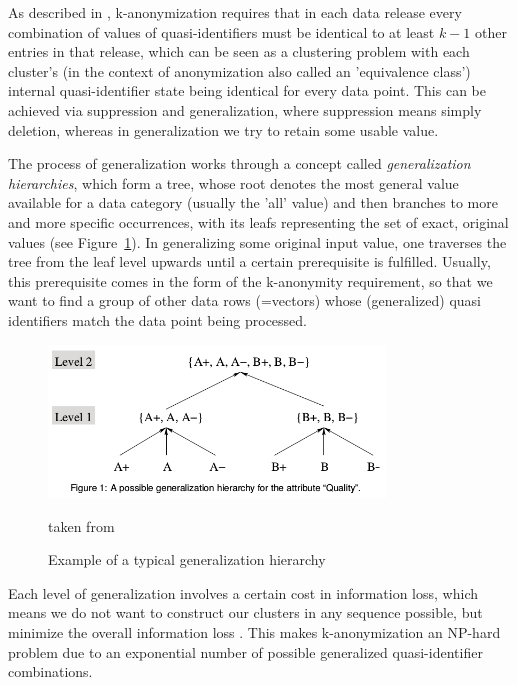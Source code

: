 \documentclass{llncs}
\begin{document}
As described in \cite{ciriani2007kappa}, k-anonymization requires that in each data release every combination of values of quasi-identifiers must be identical to at least $k-1$ other entries in that release, which can be seen as a clustering problem with each cluster's (in the context of anonymization also called an 'equivalence class') internal quasi-identifier state being identical for every data point. This can be achieved via suppression and generalization, where suppression means simply deletion, whereas in generalization we try to retain some usable value.

The process of generalization works through a concept called \textit{generalization hierarchies}, which form a tree, whose root denotes the most general value available for a data category (usually the 'all' value) and then branches to more and more specific occurrences, with its leafs representing the set of exact, original values (see Figure~\ref{fig:gen_hierarchy}). In generalizing some original input value, one traverses the tree from the leaf level upwards until a certain prerequisite is fulfilled. Usually, this prerequisite comes in the form of the k-anonymity requirement, so that we want to find a group of other data rows (=vectors) whose (generalized) quasi identifiers match the data point being processed.

\begin{figure}[!t]
	\begin{center}
		\includegraphics[width=0.8\textwidth]{figures/anonym/gen_hierarchy}
		\caption{Example of a typical generalization hierarchy}
		\label{fig:gen_hierarchy}
		\small
		taken from \cite{aggarwal2005approximation}
	\end{center}
\end{figure}


Each level of generalization involves a certain cost in information loss, which means we do not want to construct our clusters in any sequence possible, but minimize the overall information loss \cite{aggarwal2005approximation}. This makes k-anonymization an NP-hard problem due to an exponential number of possible generalized quasi-identifier combinations.
\end{document}
